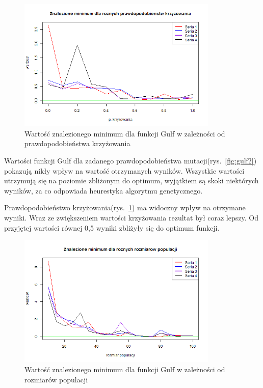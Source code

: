 \documentclass[11pt, a4paper]{article}
\newcommand{\fbi}{\leavevmode{\parindent=1em\indent}}
\begin{document}
\begin{figure}[H]
	\begin{center}
		\includegraphics[width=0.85\textwidth]{./assets/Gulf3.png}
		\caption{Wartość znalezionego minimum dla funkcji Gulf w zależności od prawdopodobieństwa krzyżowania}
		\label{fig:gulf3}
	\end{center}
\end{figure}

\fbi
Wartości funkcji Gulf dla zadanego prawdopodobieństwa mutacji(rys.~\ref{fig:gulf2}) pokazują nikły wpływ na wartość otrzymanych wyników. Wszystkie wartości utrzymują się na poziomie zbliżonym do optimum, wyjątkiem są skoki niektórych wyników, za co odpowiada heurestyka algorytmu genetycznego.

\fbi
Prawdopodobieństwo krzyżowania(rys.~\ref{fig:gulf3}) ma widoczny wpływ na otrzymane wyniki. Wraz ze zwiększeniem wartości krzyżowania rezultat był coraz lepszy. Od przyjętej wartości równej 0,5 wyniki zbliżyły się do optimum funkcji.

\begin{figure}[H]
	\begin{center}
		\includegraphics[width=0.85\textwidth]{./assets/Gulf4.png}
		\caption{Wartość znalezionego minimum dla funkcji Gulf w zależności od rozmiarów populacji}
		\label{fig:gulf4}
	\end{center}
\end{figure}
\end{document}
